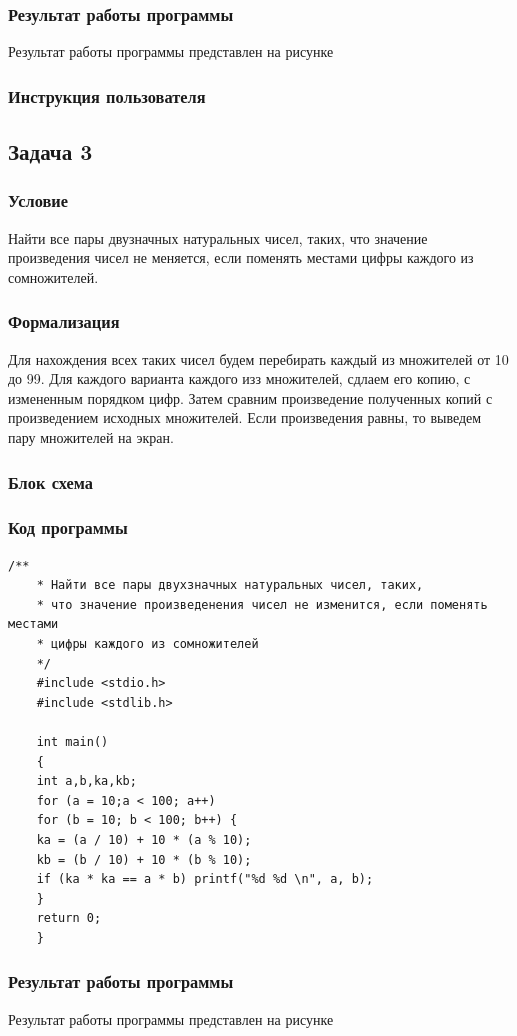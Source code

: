 \documentclass[simple,14pt]{eskdtext}
\begin{document}
	\subsubsection{Результат работы программы}
	Результат работы программы представлен на рисунке
	\subsubsection{Инструкция пользователя}
	
	\subsection{Задача 3}
	\subsubsection{Условие}
	Найти все пары двузначных натуральных чисел, таких, что значение произведения чисел не меняется, если поменять местами цифры каждого из сомножителей. 
	\subsubsection{Формализация}
	Для нахождения всех таких чисел будем перебирать каждый из множителей от 10 до 99. Для каждого варианта каждого изз множителей, сдлаем его копию, с измененным порядком цифр. Затем сравним произведение полученных копий с произведением исходных множителей. Если произведения равны, то выведем пару множителей на экран.
	\subsubsection{Блок схема}
	\subsubsection{Код программы}
	\begin{lstlisting}[label=some-code3,caption=Задача 3]
	/**
	* Найти все пары двухзначных натуральных чисел, таких,
	* что значение произведенения чисел не изменится, если поменять местами
	* цифры каждого из сомножителей
	*/
	#include <stdio.h>
	#include <stdlib.h>
	
	int main()
	{
	int a,b,ka,kb;
	for (a = 10;a < 100; a++)
	for (b = 10; b < 100; b++) {
	ka = (a / 10) + 10 * (a % 10);
	kb = (b / 10) + 10 * (b % 10);
	if (ka * ka == a * b) printf("%d %d \n", a, b);
	}
	return 0;
	}
	\end{lstlisting}
	\subsubsection{Результат работы программы}
	Результат работы программы представлен на рисунке 
\end{document}
